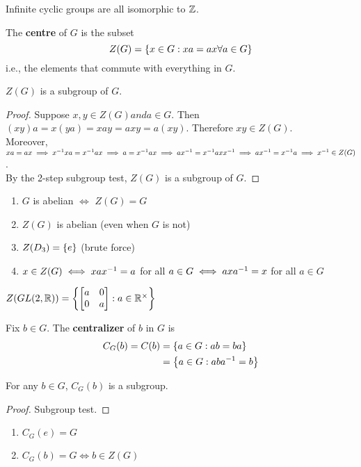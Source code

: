 \begin{remark}
    Infinite cyclic groups are all isomorphic to $\mathbb{Z}$.
\end{remark}

\begin{definition}
    The \textbf{centre} of $G$ is the subset $$Z(G) = \left\{x \in G: xa = ax \forall a \in G\right\}$$ i.e., the elements that commute with everything in $G$.
\end{definition}

\begin{theorem}
    $Z(G)$ is a subgroup of $G$.
\end{theorem}
\begin{proof}
    Suppose $x,y \in Z(G) and a \in G$. Then $(xy)a = x(ya) = xay = axy = a(xy)$. Therefore $xy \in Z(G)$. \\
    Moreover, $xa=ax \implies x^{-1} xa = x^{-1} ax \implies a = x^{-1} ax \implies ax^{-1} = x^{-1} a xx^{-1} \implies ax^{-1} = x^{-1} a \implies x^{-1} \in Z(G)$. \\
    By the 2-step subgroup test, $Z(G)$ is a subgroup of $G$.
\end{proof}

\begin{remark}
    \begin{enumerate}
        \item $G$ is abelian $\iff$ $Z(G) = G$
        \item $Z(G)$ is abelian (even when $G$ is not)
        \item $Z(D_3) = \left\{e\right\}$ (brute force)
        \item $x \in Z(G) \iff x a x^{-1} = a$ for all $a \in G \iff a x a^{-1} = x$ for all $a \in G$
    \end{enumerate}
\end{remark}

\begin{example}
    $Z(GL(2,\mathbb{R})) = \left\{\begin{bmatrix} a & 0 \\ 0 & a\end{bmatrix}: a \in \mathbb{R}^\times\right\}$
\end{example}

\begin{definition}
    Fix $b \in G$. The \textbf{centralizer} of $b$ in $G$ is \begin{align*}
        C_G(b) = C(b) &= \left\{a \in G: ab = ba\right\} \\
        &= \left\{a \in G: aba^{-1} = b\right\}
    \end{align*}
\end{definition}

\begin{theorem}
    For any $b \in G$, $C_G(b)$ is a subgroup.
\end{theorem}
\begin{proof}
    Subgroup test.
\end{proof}

\begin{example}
    \spacebeforelist
    \begin{enumerate}
        \item $C_G(e) = G$
        \item $C_G(b) = G \iff b \in Z(G)$
    \end{enumerate}
\end{example}